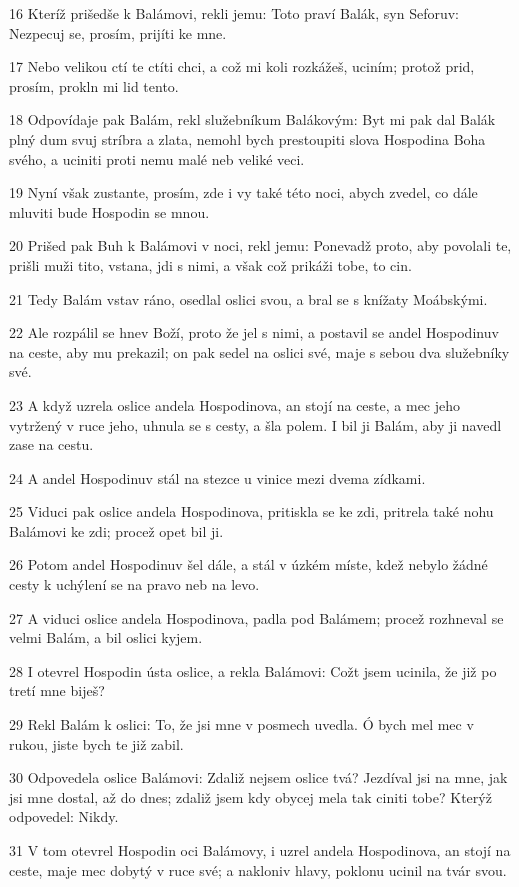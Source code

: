 \par 16 Kteríž prišedše k Balámovi, rekli jemu: Toto praví Balák, syn Seforuv: Nezpecuj se, prosím, prijíti ke mne.
\par 17 Nebo velikou ctí te ctíti chci, a což mi koli rozkážeš, uciním; protož prid, prosím, prokln mi lid tento.
\par 18 Odpovídaje pak Balám, rekl služebníkum Balákovým: Byt mi pak dal Balák plný dum svuj stríbra a zlata, nemohl bych prestoupiti slova Hospodina Boha svého, a uciniti proti nemu malé neb veliké veci.
\par 19 Nyní však zustante, prosím, zde i vy také této noci, abych zvedel, co dále mluviti bude Hospodin se mnou.
\par 20 Prišed pak Buh k Balámovi v noci, rekl jemu: Ponevadž proto, aby povolali te, prišli muži tito, vstana, jdi s nimi, a však což prikáži tobe, to cin.
\par 21 Tedy Balám vstav ráno, osedlal oslici svou, a bral se s knížaty Moábskými.
\par 22 Ale rozpálil se hnev Boží, proto že jel s nimi, a postavil se andel Hospodinuv na ceste, aby mu prekazil; on pak sedel na oslici své, maje s sebou dva služebníky své.
\par 23 A když uzrela oslice andela Hospodinova, an stojí na ceste, a mec jeho vytržený v ruce jeho, uhnula se s cesty, a šla polem. I bil ji Balám, aby ji navedl zase na cestu.
\par 24 A andel Hospodinuv stál na stezce u vinice mezi dvema zídkami.
\par 25 Viduci pak oslice andela Hospodinova, pritiskla se ke zdi, pritrela také nohu Balámovi ke zdi; procež opet bil ji.
\par 26 Potom andel Hospodinuv šel dále, a stál v úzkém míste, kdež nebylo žádné cesty k uchýlení se na pravo neb na levo.
\par 27 A viduci oslice andela Hospodinova, padla pod Balámem; procež rozhneval se velmi Balám, a bil oslici kyjem.
\par 28 I otevrel Hospodin ústa oslice, a rekla Balámovi: Cožt jsem ucinila, že již po tretí mne biješ?
\par 29 Rekl Balám k oslici: To, že jsi mne v posmech uvedla. Ó bych mel mec v rukou, jiste bych te již zabil.
\par 30 Odpovedela oslice Balámovi: Zdaliž nejsem oslice tvá? Jezdíval jsi na mne, jak jsi mne dostal, až do dnes; zdaliž jsem kdy obycej mela tak ciniti tobe? Kterýž odpovedel: Nikdy.
\par 31 V tom otevrel Hospodin oci Balámovy, i uzrel andela Hospodinova, an stojí na ceste, maje mec dobytý v ruce své; a nakloniv hlavy, poklonu ucinil na tvár svou.
